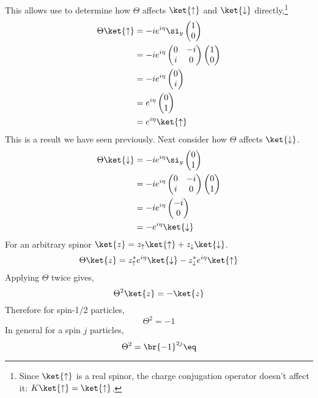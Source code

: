 \documentclass{article}
\begin{document}
This allows use to determine how $\Theta$ affects $\ket{\uparrow}$ and $\ket{\downarrow}$ directly,\footnote{Since $\ket{\uparrow}$ is a real spinor, the charge conjugation operator doesn't affect it: $K \ket{\uparrow} = \ket{\uparrow}$.}
\begin{align*}
\Theta \ket{\uparrow}
&= - i e^{i \eta} \si_y \begin{pmatrix} 1 \\ 0 \end{pmatrix} \\
&= - i e^{i \eta} \begin{pmatrix} 0 & -i \\ i & 0 \end{pmatrix} \begin{pmatrix} 1 \\ 0 \end{pmatrix} \\
&= - i e^{i \eta} \begin{pmatrix} 0 \\ i \end{pmatrix} \\
&= e^{i \eta} \begin{pmatrix} 0 \\ 1 \end{pmatrix} \\
&= e^{i \eta} \ket{\uparrow}
\end{align*}
This is a result we have seen previously. Next consider how $\Theta$ affects $\ket{\downarrow}$.
\begin{align*}
\Theta \ket{\downarrow}
&= - i e^{i \eta} \si_y \begin{pmatrix} 0 \\ 1 \end{pmatrix} \\
&= - i e^{i \eta} \begin{pmatrix} 0 & -i \\ i & 0 \end{pmatrix} \begin{pmatrix} 0 \\ 1 \end{pmatrix} \\
&= - i e^{i \eta} \begin{pmatrix} -i \\ 0 \end{pmatrix} \\
&= -e^{i \eta} \ket{\downarrow}
\end{align*}
For an arbitrary spinor $\ket{z} = z_{\uparrow} \ket{\uparrow} + z_{\downarrow} \ket{\downarrow}$.
\[ \Theta \ket{z} = z_{\uparrow}^{*} e^{i \eta} \ket{\downarrow} - z_{\downarrow}^{*} e^{i \eta} \ket{\uparrow} \]
Applying $\Theta$ twice gives,
\[ \Theta^2 \ket{z} = - \ket{z} \]
Therefore for spin-1/2 particles,
\[ \Theta^2 = - 1 \]
In general for a spin $j$ particles,
\[ \Theta^2 = \br{-1}^{2j} \eq \label{eq:time_reversal_spin} \]
\end{document}
